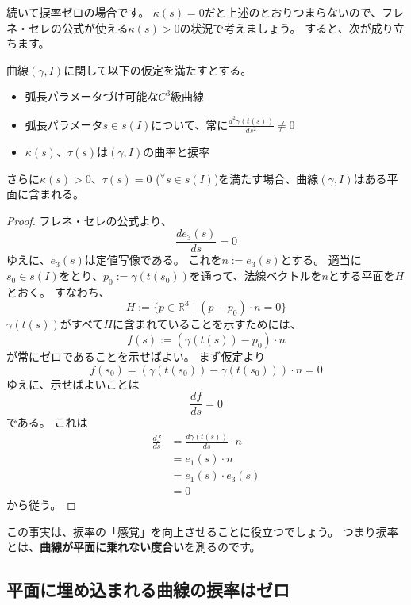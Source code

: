 続いて捩率ゼロの場合です。
$\kappa(s)=0$だと上述のとおりつまらないので、フレネ・セレの公式が使える$\kappa(s)>0$の状況で考えましょう。
すると、次が成り立ちます。
\begin{example}
  曲線$(\gamma,I)$に関して以下の仮定を満たすとする。
  \begin{itemize}
    \item 弧長パラメータづけ可能な$C^3$級曲線
    \item 弧長パラメータ$s\in s(I)$について、常に$\frac{d^2\gamma(t(s))}{ds^2}\neq0$
    \item $\kappa(s)$、$\tau(s)$は$(\gamma,I)$の曲率と捩率
  \end{itemize}
  さらに$\kappa(s)>0$、$\tau(s)=0$ (${}^\forall s\in s(I)$)を満たす場合、曲線$(\gamma,I)$はある平面に含まれる。
\end{example}
\begin{proof}
  フレネ・セレの公式より、
  \[
    \frac{de_3(s)}{ds}=0
  \]
  ゆえに、$e_3(s)$は定値写像である。
  これを$n:=e_3(s)$とする。
  適当に$s_0\in s(I)$をとり、$p_0:=\gamma(t(s_0))$を通って、法線ベクトルを$n$とする平面を$H$とおく。
  すなわち、
  \[
    H:=\{p\in\mathbb{R}^3\mid(p-p_0)\cdot n=0\}
  \]
  $\gamma(t(s))$がすべて$H$に含まれていることを示すためには、
  \[
    f(s):=(\gamma(t(s))-p_0)\cdot n
  \]
  が常にゼロであることを示せばよい。
  まず仮定より
  \[
    f(s_0)=(\gamma(t(s_0))-\gamma(t(s_0)))\cdot n=0
  \]
  ゆえに、示せばよいことは
  \[
    \frac{df}{ds}=0
  \]
  である。
  これは
  \begin{align*}
    \frac{df}{ds}&=\frac{d\gamma(t(s))}{ds}\cdot n\\
    &=e_1(s)\cdot n\\
    &=e_1(s)\cdot e_3(s)\\
    &=0
  \end{align*}
  から従う。
\end{proof}
この事実は、捩率の「感覚」を向上させることに役立つでしょう。
つまり捩率とは、\textbf{曲線が平面に乗れない度合い}を測るのです。

\subsection{平面に埋め込まれる曲線の捩率はゼロ}

